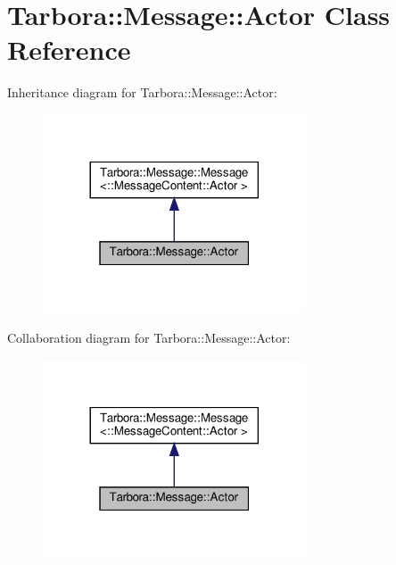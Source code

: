 \hypertarget{classTarbora_1_1Message_1_1Actor}{}\section{Tarbora\+:\+:Message\+:\+:Actor Class Reference}
\label{classTarbora_1_1Message_1_1Actor}


Inheritance diagram for Tarbora\+:\+:Message\+:\+:Actor\+:\nopagebreak
\begin{figure}[H]
\begin{center}
\leavevmode
\includegraphics[width=221pt]{classTarbora_1_1Message_1_1Actor__inherit__graph}
\end{center}
\end{figure}


Collaboration diagram for Tarbora\+:\+:Message\+:\+:Actor\+:\nopagebreak
\begin{figure}[H]
\begin{center}
\leavevmode
\includegraphics[width=221pt]{classTarbora_1_1Message_1_1Actor__coll__graph}
\end{center}
\end{figure}
